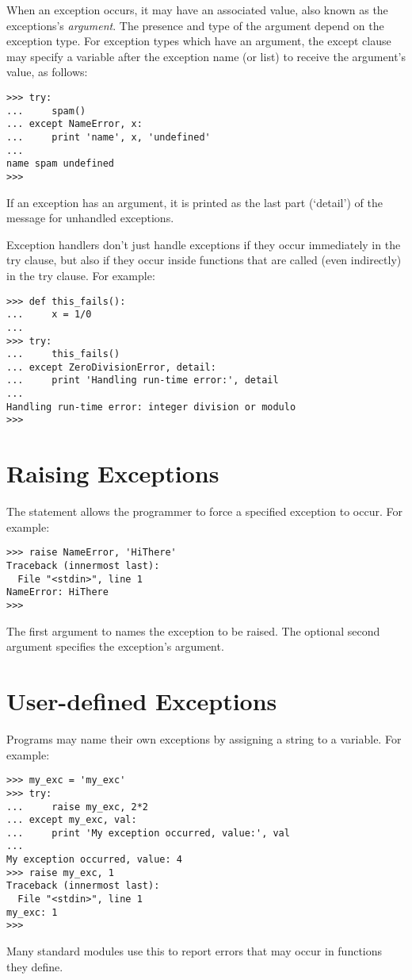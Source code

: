When an exception occurs, it may have an associated value, also known as
the exceptions's
\emph{argument}.
The presence and type of the argument depend on the exception type.
For exception types which have an argument, the except clause may
specify a variable after the exception name (or list) to receive the
argument's value, as follows:

\bcode\begin{verbatim}
>>> try:
...     spam()
... except NameError, x:
...     print 'name', x, 'undefined'
... 
name spam undefined
>>> 
\end{verbatim}\ecode
%
If an exception has an argument, it is printed as the last part
(`detail') of the message for unhandled exceptions.

Exception handlers don't just handle exceptions if they occur
immediately in the try clause, but also if they occur inside functions
that are called (even indirectly) in the try clause.
For example:

\bcode\begin{verbatim}
>>> def this_fails():
...     x = 1/0
... 
>>> try:
...     this_fails()
... except ZeroDivisionError, detail:
...     print 'Handling run-time error:', detail
... 
Handling run-time error: integer division or modulo
>>>
\end{verbatim}\ecode
%

\section{Raising Exceptions}

The  statement allows the programmer to force a specified
exception to occur.
For example:

\bcode\begin{verbatim}
>>> raise NameError, 'HiThere'
Traceback (innermost last):
  File "<stdin>", line 1
NameError: HiThere
>>> 
\end{verbatim}\ecode
%
The first argument to  names the exception to be raised.
The optional second argument specifies the exception's argument.

%

\section{User-defined Exceptions}

Programs may name their own exceptions by assigning a string to a
variable.
For example:

\bcode\begin{verbatim}
>>> my_exc = 'my_exc'
>>> try:
...     raise my_exc, 2*2
... except my_exc, val:
...     print 'My exception occurred, value:', val
... 
My exception occurred, value: 4
>>> raise my_exc, 1
Traceback (innermost last):
  File "<stdin>", line 1
my_exc: 1
>>> 
\end{verbatim}\ecode
%
Many standard modules use this to report errors that may occur in
functions they define.

